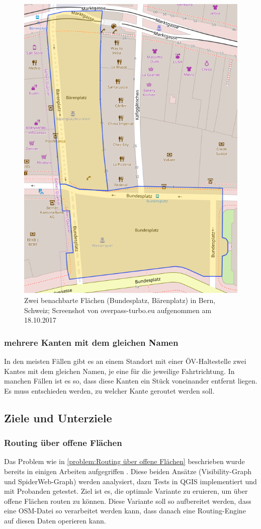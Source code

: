 \begin{figure}[ht]
\centering
\includegraphics[width=0.5\linewidth]{technicalreport/img/bundesplatz_baerenplatz}
\caption[Zwei benachbarte Flächen]{Zwei benachbarte Flächen (Bundesplatz, Bärenplatz) in Bern, Schweiz; Screenshot von overpass-turbo.eu aufgenommen am 18.10.2017}
\label{fig:bundesplatz_baerenplatz}
\end{figure}

\subsubsection{mehrere Kanten mit dem gleichen Namen}
\label{problem:mehrere Kanten mit dem gleichen Namen}
In den meisten Fällen gibt es an einem Standort mit einer ÖV-Haltestelle zwei \glspl{Kante} mit dem gleichen Namen, je eine für die jeweilige Fahrtrichtung. In manchen Fällen ist es so, dass diese Kanten ein Stück voneinander entfernt liegen. Es muss entschieden werden, zu welcher Kante geroutet werden soll.
	
\subsection{Ziele und Unterziele}
\label{Ziele und Unterziele}

\subsubsection{Routing über offene Flächen}
\label{target:Routing über offene Flächen}
Das Problem wie in \ref{problem:Routing über offene Flächen} beschrieben wurde bereits in einigen Arbeiten aufgegriffen \cite{graser_visibility_graph} \cite{dzafic_spider_web_graph}. Diese beiden Ansätze (Visibility-Graph und SpiderWeb-Graph) werden analysiert, dazu Tests in QGIS implementiert und mit Probanden getestet. Ziel ist es, die optimale Variante zu eruieren, um über offene Flächen routen zu können. Diese Variante soll so aufbereitet werden, dass eine \ac{OSM}-Datei so verarbeitet werden kann, dass danach eine Routing-Engine auf diesen Daten operieren kann.

